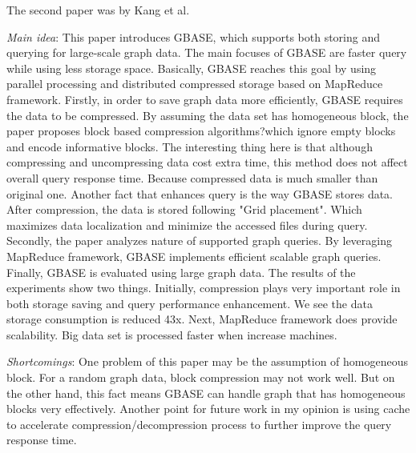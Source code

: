 The second paper was by Kang et al.
\cite{Kang:2012vv}
\begin{itemize*}
\item {\em Main idea}: This paper introduces GBASE, which supports both storing and querying for large-scale graph data. The main focuses of GBASE are faster query while using less storage space. Basically, GBASE reaches this goal by using parallel processing and distributed compressed storage based on MapReduce framework.
Firstly, in order to save graph data more efficiently, GBASE requires the data to be compressed. By assuming the data set has homogeneous block, the paper proposes block based compression algorithms?which ignore empty blocks and encode informative blocks. The interesting thing here is that although compressing and uncompressing data cost extra time, this method does not affect overall query response time. Because compressed data is much smaller than original one. Another fact that enhances query is the way GBASE stores data. After compression, the data is stored following "Grid placement". Which maximizes data localization and minimize the accessed files during query.
Secondly, the paper analyzes nature of supported graph queries. By leveraging MapReduce framework, GBASE implements efficient scalable graph queries.
Finally, GBASE is evaluated using large graph data. The results of the experiments show two things. Initially, compression plays very important role in both storage saving and query performance enhancement. We see the data storage consumption is reduced 43x. Next, MapReduce framework does provide scalability. Big data set is processed faster when increase machines.
\item {\em Shortcomings}:
	One problem of this paper may be the assumption of homogeneous block. For a random graph data, block compression may not work well. But on the other hand, this fact means GBASE can handle graph that has homogeneous blocks very effectively.
	Another point for future work in my opinion is using cache to accelerate compression/decompression process to further improve the query response time.
\end{itemize*}


